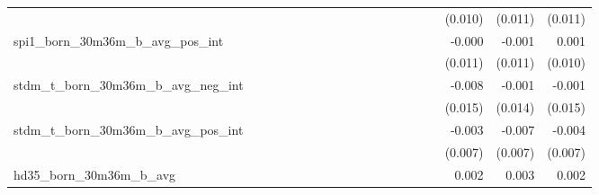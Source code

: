 \begin{tabular}{lrrrrrrrrrrrrrrrrrr}
                                            &              &              &              &              &              &              &              &              &               &              &              &               &              &              &               &      (0.010) &      (0.011) &       (0.011) \\ 
spi1\_born\_30m36m\_b\_avg\_pos\_int        &              &              &              &              &              &              &              &              &               &              &              &               &              &              &               &       -0.000 &       -0.001 &         0.001 \\ 
                                            &              &              &              &              &              &              &              &              &               &              &              &               &              &              &               &      (0.011) &      (0.011) &       (0.010) \\ 
stdm\_t\_born\_30m36m\_b\_avg\_neg\_int     &              &              &              &              &              &              &              &              &               &              &              &               &              &              &               &       -0.008 &       -0.001 &        -0.001 \\ 
                                            &              &              &              &              &              &              &              &              &               &              &              &               &              &              &               &      (0.015) &      (0.014) &       (0.015) \\ 
stdm\_t\_born\_30m36m\_b\_avg\_pos\_int     &              &              &              &              &              &              &              &              &               &              &              &               &              &              &               &       -0.003 &       -0.007 &        -0.004 \\ 
                                            &              &              &              &              &              &              &              &              &               &              &              &               &              &              &               &      (0.007) &      (0.007) &       (0.007) \\ 
hd35\_born\_30m36m\_b\_avg                  &              &              &              &              &              &              &              &              &               &              &              &               &              &              &               &        0.002 &        0.003 &         0.002 \\ 

\end{tabular}
